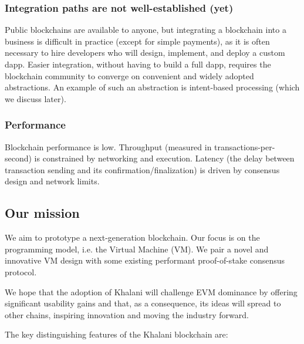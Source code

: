 \documentclass[a4paper]{article}
\begin{document}
\subsubsection{Integration paths are not well-established (yet)}

Public blockchains are available to anyone, but integrating a blockchain into a business is difficult in practice (except for simple payments), as it is often necessary to hire developers who will design, implement, and deploy a custom dapp. Easier integration, without having to build a full dapp, requires the blockchain community to converge on convenient and widely adopted abstractions. An example of such an abstraction is intent-based processing (which we discuss later).

\subsubsection{Performance}

Blockchain performance is low. Throughput (measured in transactions-per-second) is constrained by networking and execution. Latency (the delay between transaction sending and its confirmation/finalization) is driven by consensus design and network limits.

\subsection{Our mission}

We aim to prototype a next-generation blockchain. Our focus is on the programming model, i.e. the Virtual Machine (VM). We pair a novel and innovative VM design with some existing performant proof-of-stake consensus protocol.

We hope that the adoption of Khalani will challenge EVM dominance by offering significant usability gains and that, as a consequence, its ideas will spread to other chains, inspiring innovation and moving the industry forward.

The key distinguishing features of the Khalani blockchain are:
\end{document}
